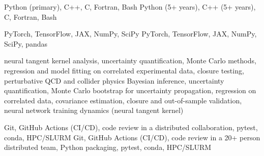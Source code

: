 
  {Python (primary), C++, C, Fortran, Bash}
  {Python (5+ years), C++ (5+ years), C, Fortran, Bash}

  {PyTorch, TensorFlow, JAX, NumPy, SciPy}
  {PyTorch, TensorFlow, JAX, NumPy, SciPy, pandas}

  {neural tangent kernel analysis, uncertainty quantification, Monte Carlo
   methods, regression and model fitting on correlated experimental data,
   closure testing, perturbative QCD and collider physics}
  {Bayesian inference, uncertainty quantification, Monte Carlo bootstrap for
   uncertainty propagation, regression on
   correlated data, covariance estimation, closure and out-of-sample validation,
   neural network training dynamics (neural tangent kernel)}

  {Git, GitHub Actions (CI/CD), code review in a distributed collaboration,
   pytest, conda, HPC/SLURM}
  {Git, GitHub Actions (CI/CD), code review in a 20+ person distributed team,
   Python packaging, pytest, conda, HPC/SLURM}

